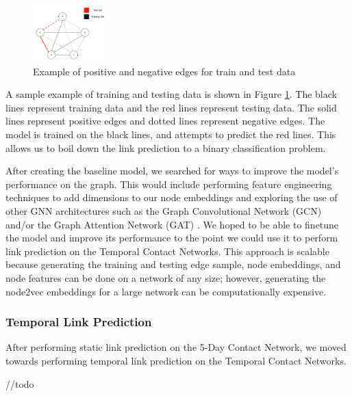 \documentclass[times, 10pt,twocolumn]{article}
\begin{document}
\begin{figure}
    \centering
    \includegraphics[width=0.25\textwidth]{imgs/static_prediction_data_split.png}
    \caption{Example of positive and negative edges for train and test data}
    \label{fig:toy_edges_label}
\end{figure}

A sample example of training and testing data is shown in Figure \ref{fig:toy_edges_label}. The black lines represent training data and the red lines represent testing data. The solid lines represent positive edges and dotted lines represent negative edges. The model is trained on the black lines, and attempts to predict the red lines. This allows us to boil down the link prediction to a binary classification problem.

After creating the baseline model, we searched for ways to improve the model's performance on the graph. This would include performing feature engineering techniques to add dimensions to our node embeddings and exploring the use of other GNN architectures such as the Graph Convolutional Network (GCN) and/or the Graph Attention Network (GAT) \cite{kipf2017semisupervised} \cite{veličković2018graph}. We hoped to be able to finetune the model and improve its performance to the point we could use it to perform link prediction on the Temporal Contact Networks. This approach is scalable because generating the training and testing edge sample, node embeddings, and node features can be done on a network of any size; however, generating the node2vec embeddings for a large network can be computationally expensive.

\subsubsection{Temporal Link Prediction}
After performing static link prediction on the 5-Day Contact Network, we moved towards performing temporal link prediction on the Temporal Contact Networks.

//todo



\end{document}
